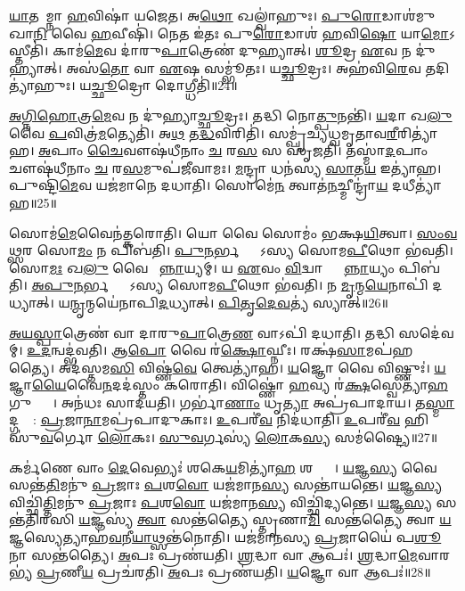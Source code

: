 \ul{𑌯𑌾}𑌤𑌯𑌾᳚𑌮𑍍𑌨𑌾 \ul{𑌹}𑌵𑌿𑌷𑌾॑ 𑌯𑌜𑍇𑌤।
𑌅\ul{𑌥𑍋} 𑌖𑌲𑍍𑌵𑌾॑𑌹𑍁𑌃।
\ul{𑌪𑍁}\ul{𑌰𑍋}𑌡𑌾𑌶॑𑌮𑍁𑌖𑌾\ul{𑌨𑌿} 𑌵𑍈 \ul{𑌹}𑌵𑍀𑌷𑌿॑।
𑌨𑍇𑌤 𑌇॑𑌤𑌃 𑌪𑍁\ul{𑌰𑍋}𑌡𑌾𑌶॑ \ul{𑌹}𑌵𑌿\ul{𑌷𑍋} 𑌯𑌾\ul{𑌮𑍋}\-𑌽𑌸𑍍𑌤𑍀𑌤𑌿॑।
𑌕𑌾𑌮॑\ul{𑌮𑍇}𑌵 𑌦𑌾॑𑌰𑍁\ul{𑌪𑌾}𑌤𑍍𑌰𑍇𑌣॑ 𑌦𑍁𑌹𑍍𑌯𑌾𑌤𑍍।
\ul{𑌶𑍂}𑌦𑍍𑌰 \ul{𑌏}𑌵 𑌨 𑌦𑍁॑𑌹𑍍𑌯𑌾𑌤𑍍।
𑌅𑌸॑\ul{𑌤𑍋} 𑌵𑌾 \ul{𑌏}𑌷 𑌸𑌮𑍍𑌭𑍂॑𑌤𑌃।
𑌯\ul{𑌚𑍍𑌛𑍂}𑌦𑍍𑌰𑌃।
𑌅𑌹॑𑌵𑌿\ul{𑌰𑍇}𑌵 𑌤𑌦𑌿𑌤𑍍𑌯𑌾॑𑌹𑍁𑌃।
𑌯\ul{𑌚𑍍𑌛𑍂}𑌦𑍍𑌰𑍋 𑌦𑍋𑌗𑍍𑌧𑍀𑌤𑌿॑॥24॥

\ul{𑌅}\ul{𑌗𑍍𑌨𑌿}\ul{𑌹𑍋}𑌤𑍍𑌰\ul{𑌮𑍇}𑌵 𑌨 𑌦𑍁॑𑌹𑍍𑌯𑌾\ul{𑌚𑍍𑌛𑍂}𑌦𑍍𑌰𑌃।
𑌤𑌦𑍍𑌧𑌿 𑌨𑍋\ul{𑌤𑍍𑌪𑍁}𑌨𑌨𑍍𑌤𑌿॑।
\ul{𑌯}𑌦𑌾 𑌖\ul{𑌲𑍁} 𑌵𑍈 \ul{𑌪}𑌵𑌿𑌤𑍍𑌰॑\ul{𑌮}𑌤𑍍𑌯𑍇𑌤𑌿॑।
𑌅\ul{𑌥} 𑌤\ul{𑌦𑍍𑌧}𑌵𑌿𑌰𑌿𑌤𑌿॑।
𑌸𑌮𑍍𑌪𑍃॑𑌚𑍍𑌯𑌧𑍍𑌵𑌮𑍃𑌤𑌾𑌵\ul{𑌰𑍀}𑌰𑌿𑌤𑍍𑌯𑌾॑𑌹।
\ul{𑌅}𑌪𑌾𑌂 \ul{𑌚𑍈}𑌵𑍗𑌷॑𑌧𑍀𑌨𑌾𑌂 \ul{𑌚} 𑌰\ul{𑌸}\ul{} 𑌸 𑌸𑍃॑𑌜𑌤𑌿।
𑌤𑌸𑍍𑌮𑌾॑\ul{𑌦}𑌪𑌾𑌂 𑌚𑍗𑌷॑𑌧𑍀𑌨𑌾𑌂 \ul{𑌚} 𑌰\ul{𑌸}𑌮𑍁𑌪॑𑌜𑍀𑌵𑌾𑌮𑌃।
\ul{𑌮}𑌨𑍍𑌦𑍍𑌰𑌾 𑌧𑌨॑𑌸𑍍𑌯 \ul{𑌸𑌾}𑌤\ul{𑌯} 𑌇𑌤𑍍𑌯𑌾॑𑌹।
𑌪𑍁𑌷𑍍𑌟𑌿॑\ul{𑌮𑍇}𑌵 𑌯𑌜॑𑌮𑌾𑌨𑍇 𑌦𑌧𑌾𑌤𑌿।
𑌸𑍋𑌮𑍇॑\ul{𑌨} 𑌤𑍍𑌵𑌾𑌤॑\ul{𑌨}𑌚𑍍𑌮𑍀𑌨𑍍𑌦𑍍𑌰𑌾॑\ul{𑌯} 𑌦𑌧𑍀𑌤𑍍𑌯𑌾॑𑌹॥25॥

𑌸𑍋𑌮॑\ul{𑌮𑍇}𑌵𑍈𑌨॑𑌤𑍍𑌕𑌰𑍋𑌤𑌿।
𑌯𑍋 𑌵𑍈 𑌸𑍋𑌮𑌂॑ 𑌭𑌕𑍍𑌷\ul{𑌯𑌿}𑌤𑍍𑌵𑌾।
\ul{𑌸𑌂}\ul{𑌵}\ul{𑌥𑍍𑌸}𑌰 𑌸𑍋\ul{𑌮𑌂} 𑌨 𑌪𑌿𑌬॑𑌤𑌿।
\ul{𑌪𑍁}\ul{𑌨}𑌰𑍍𑌭𑌕𑍍𑌷𑍍𑌯𑍋᳚𑌽𑌸𑍍𑌯 𑌸𑍋𑌮\ul{𑌪𑍀}𑌥𑍋 𑌭॑𑌵𑌤𑌿।
𑌸𑍋\ul{𑌮𑌃} 𑌖\ul{𑌲𑍁} 𑌵𑍈 𑌸𑌾᳚\ul{𑌨𑍍𑌨𑌾}𑌯𑍍𑌯𑌮𑍍।
𑌯 \ul{𑌏}𑌵𑌂 \ul{𑌵𑌿}𑌦𑍍𑌵𑌾𑌨𑍍𑌥𑍍𑌸𑌾᳚\ul{𑌨𑍍𑌨𑌾}𑌯𑍍𑌯𑌂 𑌪𑌿𑌬॑𑌤𑌿।
\ul{𑌅}\ul{𑌪𑍁}\ul{𑌨}𑌰𑍍𑌭𑌕𑍍𑌷𑍍𑌯𑍋᳚𑌽𑌸𑍍𑌯 𑌸𑍋𑌮\ul{𑌪𑍀}𑌥𑍋 𑌭॑𑌵𑌤𑌿।
𑌨 \ul{𑌮𑍃}𑌨𑍍𑌮\ul{𑌯𑍇}𑌨𑌾𑌪𑌿॑ 𑌦𑌧𑍍𑌯𑌾𑌤𑍍।
𑌯\ul{𑌨𑍍𑌮𑍃}𑌨𑍍𑌮𑌯𑍇॑𑌨𑌾𑌪𑌿\ul{𑌦}𑌧𑍍𑌯𑌾𑌤𑍍।
\ul{𑌪𑌿}\ul{𑌤𑍃}\ul{𑌦𑍇}\ul{𑌵}𑌤𑍍𑌯॑ 𑌸𑍍𑌯𑌾𑌤𑍍॥26॥

\ul{𑌅}\ul{𑌯}\ul{𑌸𑍍𑌪𑌾}𑌤𑍍𑌰𑍇𑌣॑ 𑌵𑌾 𑌦𑌾𑌰𑍁\ul{𑌪𑌾}𑌤𑍍𑌰𑍇\ul{𑌣} 𑌵𑌾𑌽𑌪𑌿॑ 𑌦𑌧𑌾𑌤𑌿।
𑌤𑌦𑍍𑌧𑌿 𑌸𑌦𑍇॑𑌵𑌮𑍍।
\ul{𑌉}\ul{𑌦}𑌨𑍍𑌵𑌦𑍍𑌭॑𑌵𑌤𑌿।
𑌆\ul{𑌪𑍋} 𑌵𑍈 𑌰॑\ul{𑌕𑍍𑌷𑍋}𑌘𑍍𑌨𑍀𑌃।
𑌰𑌕𑍍𑌷॑\ul{𑌸𑌾}𑌮𑌪॑𑌹𑌤𑍍𑌯𑍈।
𑌅𑌦॑𑌸𑍍𑌤𑌮\ul{𑌸𑌿} 𑌵𑌿𑌷𑍍𑌣॑\ul{𑌵𑍇} 𑌤𑍍𑌵𑍇𑌤𑍍𑌯𑌾॑𑌹।
\ul{𑌯}𑌜𑍍𑌞𑍋 𑌵𑍈 𑌵𑌿𑌷𑍍𑌣𑍁𑌃॑।
\ul{𑌯}𑌜𑍍𑌞𑌾\ul{𑌯𑍈}𑌵𑍈\ul{𑌨}𑌦𑌦॑𑌸𑍍𑌤𑌂 𑌕𑌰𑍋𑌤𑌿।
𑌵𑌿𑌷𑍍𑌣𑍋॑ \ul{𑌹}𑌵𑍍𑌯 𑌰॑\ul{𑌕𑍍𑌷}𑌸𑍍𑌵𑍇𑌤𑍍𑌯𑌾॑\ul{𑌹} 𑌗𑍁𑌪𑍍𑌤𑍍𑌯𑍈᳚।
𑌅𑌨॑𑌧𑌃 𑌸𑌾𑌦𑌯𑌤𑌿।
𑌗𑌰𑍍𑌭𑌾॑\ul{𑌣𑌾𑌂} 𑌧𑍃\ul{𑌤𑍍𑌯𑌾} 𑌅𑌪𑍍𑌰॑𑌪𑌾𑌦𑌾𑌯।
𑌤\ul{𑌸𑍍𑌮𑌾}𑌦𑍍𑌗𑌰𑍍𑌭𑌾᳚: \ul{𑌪𑍍𑌰}𑌜𑌾\ul{𑌨𑌾}𑌮𑌪𑍍𑌰॑𑌪𑌾𑌦𑍁𑌕𑌾𑌃।
\ul{𑌉}𑌪𑌰𑍀॑\ul{𑌵} 𑌨𑌿𑌦॑𑌧𑌾𑌤𑌿।
\ul{𑌉}𑌪𑌰𑍀॑\ul{𑌵} 𑌹𑌿 𑌸𑍁॑\ul{𑌵}𑌰𑍍𑌗𑍋 \ul{𑌲𑍋}𑌕𑌃।
\ul{𑌸𑍁}\ul{𑌵}𑌰𑍍𑌗𑌸𑍍𑌯॑ \ul{𑌲𑍋}𑌕\ul{𑌸𑍍𑌯} 𑌸𑌮॑𑌷𑍍𑌟𑍍𑌯𑍈॥27॥\anuvakamend[\ul{𑌅}𑌸𑍀𑌤𑍍𑌯𑌾॑\ul{𑌹} 𑌧𑍃\ul{𑌤𑍍𑌯𑍈} 𑌯𑌜॑𑌮𑌾𑌨𑍇 𑌦\ul{𑌧𑌾}𑌤𑍍𑌯𑌜𑌾॑𑌮𑌿𑌤𑍍𑌵𑌾𑌯 𑌸𑍍𑌥𑌾𑌪𑌯𑌤𑌿 𑌦𑍁𑌹𑍇 𑌦𑍁𑌹𑌨𑍍𑌤𑌿 \ul{𑌦𑍁}𑌹𑍍𑌯𑌾𑌦𑍍𑌦𑍋𑌗𑍍𑌧𑍀\ul{𑌤𑌿} 𑌦𑌧𑍀𑌤𑍍𑌯𑌾॑𑌹 𑌸𑍍𑌯𑌾𑌥𑍍𑌸𑌾𑌦𑌯\ul{𑌤𑌿} 𑌪𑌞𑍍𑌚॑ 𑌚]

𑌕𑌰𑍍𑌮॑𑌣𑍇 𑌵𑌾𑌂 \ul{𑌦𑍇}𑌵𑍇𑌭𑍍𑌯𑌃॑ 𑌶𑌕𑍇\ul{𑌯}𑌮𑌿𑌤𑍍𑌯𑌾॑\ul{𑌹} 𑌶𑌕𑍍𑌤𑍍𑌯𑍈᳚।
\ul{𑌯}𑌜𑍍𑌞\ul{𑌸𑍍𑌯} 𑌵𑍈 𑌸𑌨𑍍𑌤॑\ul{𑌤𑌿}𑌮𑌨𑍁॑ \ul{𑌪𑍍𑌰}𑌜𑌾𑌃 \ul{𑌪}𑌶\ul{𑌵𑍋} 𑌯𑌜॑𑌮𑌾𑌨\ul{𑌸𑍍𑌯} 𑌸𑌨𑍍𑌤𑌾॑𑌯𑌨𑍍𑌤𑍇।
\ul{𑌯}𑌜𑍍𑌞\ul{𑌸𑍍𑌯} 𑌵𑌿𑌚𑍍𑌛𑌿॑\ul{𑌤𑍍𑌤𑌿}𑌮𑌨𑍁॑ \ul{𑌪𑍍𑌰}𑌜𑌾𑌃 \ul{𑌪}𑌶\ul{𑌵𑍋} 𑌯𑌜॑𑌮𑌾𑌨\ul{𑌸𑍍𑌯} 𑌵𑌿𑌚𑍍𑌛𑌿॑𑌦𑍍𑌯𑌨𑍍𑌤𑍇।
\ul{𑌯}𑌜𑍍𑌞\ul{𑌸𑍍𑌯} 𑌸𑌨𑍍𑌤॑𑌤𑌿𑌰𑌸𑌿 \ul{𑌯}𑌜𑍍𑌞𑌸𑍍𑌯॑ \ul{𑌤𑍍𑌵𑌾} 𑌸𑌨𑍍𑌤॑𑌤𑍍𑌯𑍈 𑌸𑍍𑌤𑍃𑌣𑌾\ul{𑌮𑌿} 𑌸𑌨𑍍𑌤॑𑌤𑍍𑌯𑍈 𑌤𑍍𑌵𑌾 \ul{𑌯}𑌜𑍍𑌞𑌸𑍍𑌯𑍇𑌤𑍍𑌯𑌾𑌹॑\ul{𑌵}𑌨𑍀\ul{𑌯𑌾}𑌥𑍍𑌸𑌨𑍍𑌤॑𑌨𑍋𑌤𑌿।
𑌯𑌜॑𑌮𑌾𑌨𑌸𑍍𑌯 \ul{𑌪𑍍𑌰}𑌜𑌾𑌯𑍈॑ 𑌪\ul{𑌶𑍂}𑌨𑌾 𑌸𑌨𑍍𑌤॑𑌤𑍍𑌯𑍈।
\ul{𑌅}𑌪𑌃 𑌪𑍍𑌰𑌣॑𑌯𑌤𑌿।
\ul{𑌶𑍍𑌰}𑌦𑍍𑌧𑌾 𑌵𑌾 𑌆𑌪𑌃॑।
\ul{𑌶𑍍𑌰}𑌦𑍍𑌧𑌾\ul{𑌮𑍇}𑌵𑌾𑌰𑌭𑍍𑌯॑ \ul{𑌪𑍍𑌰}𑌣𑍀\ul{𑌯} 𑌪𑍍𑌰𑌚॑𑌰𑌤𑌿।
\ul{𑌅}𑌪𑌃 𑌪𑍍𑌰𑌣॑𑌯𑌤𑌿।
\ul{𑌯}𑌜𑍍𑌞𑍋 𑌵𑌾 𑌆𑌪𑌃॑॥28॥

